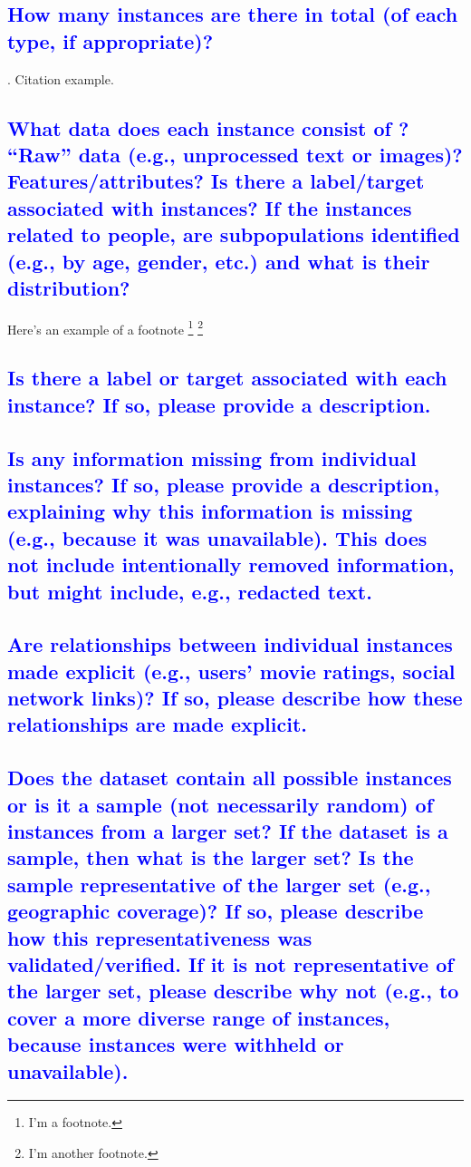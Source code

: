 \documentclass[letterpaper, 10 pt, conference]{ieeeconf}  %
\begin{document}
\textcolor{blue}{\subsection{How many instances are there in total (of each type, if appropriate)?}}
\lipsum[1]. Citation example. \cite{latex:companion, latex2e}

\textcolor{blue}{\subsection{What data does each instance consist of ? “Raw”
data (e.g., unprocessed text or images)? Features/attributes? Is there a label/target associated with
instances? If the instances related to people, are subpopulations identified (e.g., by age, gender, etc.) and what is
their distribution?}}
\lipsum[1]
Here's an example of a footnote \footnote{I'm a footnote.} \footnote{I'm another footnote.}

\textcolor{blue}{\subsection{Is there a label or target associated with each instance? If so, please
provide a description.}}
\lipsum[1]

\textcolor{blue}{\subsection{Is any information missing from individual instances? If so, please
provide a description, explaining why this information is missing (e.g., because it was unavailable). This does not include intentionally removed
information, but might include, e.g., redacted text.}}
\lipsum[1]

\textcolor{blue}{\subsection{Are relationships between individual instances made explicit (e.g.,
users’ movie ratings, social network links)? If so, please describe
how these relationships are made explicit.}}
\lipsum[1]

\textcolor{blue}{\subsection{Does the dataset contain all possible instances or is it a sample (not
necessarily random) of instances from a larger set? If the dataset is
a sample, then what is the larger set? Is the sample representative of the
larger set (e.g., geographic coverage)? If so, please describe how this
representativeness was validated/verified. If it is not representative of the
larger set, please describe why not (e.g., to cover a more diverse range of
instances, because instances were withheld or unavailable).}}
\lipsum[1]
\end{document}
